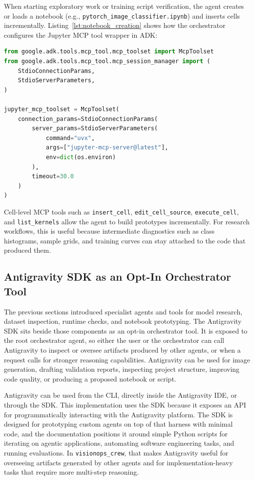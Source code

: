 \documentclass[11pt,a4paper]{article}
\begin{document}
When starting exploratory work or training script verification, the agent creates or loads a notebook (e.g., \texttt{pytorch\_image\_classifier.ipynb}) and inserts cells incrementally. Listing~\ref{lst:notebook_creation} shows how the orchestrator configures the Jupyter MCP tool wrapper in ADK:

\clearpage

\begin{lstlisting}[language=Python, caption={Registering the Jupyter MCP server over stdio in \texttt{ml\_engineer/agent.py}.}, label={lst:notebook_creation}]
from google.adk.tools.mcp_tool.mcp_toolset import McpToolset
from google.adk.tools.mcp_tool.mcp_session_manager import (
    StdioConnectionParams,
    StdioServerParameters,
)

jupyter_mcp_toolset = McpToolset(
    connection_params=StdioConnectionParams(
        server_params=StdioServerParameters(
            command="uvx",
            args=["jupyter-mcp-server@latest"],
            env=dict(os.environ)
        ),
        timeout=30.0
    )
)
\end{lstlisting}

Cell-level MCP tools such as \texttt{insert\_cell}, \texttt{edit\_cell\_source}, \texttt{execute\_cell}, and \texttt{list\_kernels} allow the agent to build prototypes incrementally. For research workflows, this is useful because intermediate diagnostics such as class histograms, sample grids, and training curves can stay attached to the code that produced them.

\subsection{Antigravity SDK as an Opt-In Orchestrator Tool}
The previous sections introduced specialist agents and tools for model research, dataset inspection, runtime checks, and notebook prototyping. The Antigravity SDK sits beside those components as an opt-in orchestrator tool. It is exposed to the root orchestrator agent, so either the user or the orchestrator can call Antigravity to inspect or oversee artifacts produced by other agents, or when a request calls for stronger reasoning capabilities. Antigravity can be used for image generation, drafting validation reports, inspecting project structure, improving code quality, or producing a proposed notebook or script.

Antigravity can be used from the CLI, directly inside the Antigravity IDE, or through the SDK. This implementation uses the SDK because it exposes an API for programmatically interacting with the Antigravity platform. The SDK is designed for prototyping custom agents on top of that harness with minimal code, and the documentation positions it around simple Python scripts for iterating on agentic applications, automating software engineering tasks, and running evaluations. In \texttt{visionops\_crew}, that makes Antigravity useful for overseeing artifacts generated by other agents and for implementation-heavy tasks that require more multi-step reasoning.
\end{document}
